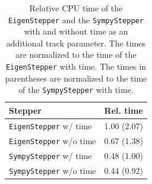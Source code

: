 \begin{table}[ht]
    \centering
    \begin{tabular}{lc}
        \hline
        \textbf{Stepper} & \textbf{Rel. time} \\
        \hline
        \texttt{EigenStepper} w/  time & 1.00 (2.07) \\
        \texttt{EigenStepper} w/o time & 0.67 (1.38) \\
        \texttt{SympyStepper} w/  time & 0.48 (1.00) \\
        \texttt{SympyStepper} w/o time & 0.44 (0.92) \\
        \hline
    \end{tabular}
    \caption{Relative CPU time of the \texttt{EigenStepper} and the \texttt{SympyStepper} with and without time as an additional track parameter. The times are normalized to the time of the \texttt{EigenStepper} with time. The times in parentheses are normalized to the time of the \texttt{SympyStepper} with time.}
    \label{tab:dev/stepper/time-param-perf}
\end{table}
